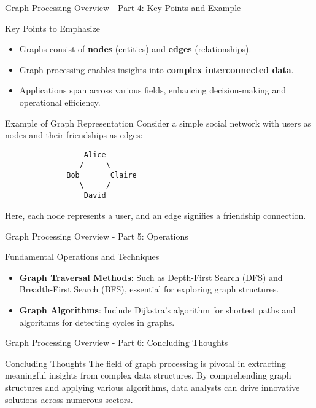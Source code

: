 \documentclass[aspectratio=169]{beamer}
\begin{document}
\begin{frame}[fragile]{Graph Processing Overview - Part 4: Key Points and Example}
    \begin{block}{Key Points to Emphasize}
        \begin{itemize}
            \item Graphs consist of \textbf{nodes} (entities) and \textbf{edges} (relationships).
            \item Graph processing enables insights into \textbf{complex interconnected data}.
            \item Applications span across various fields, enhancing decision-making and operational efficiency.
        \end{itemize}
    \end{block}
    
    \begin{block}{Example of Graph Representation}
        Consider a simple social network with users as nodes and their friendships as edges:
        \begin{center}
            \begin{verbatim}
                  Alice
                 /     \
              Bob       Claire
                 \     /
                  David
            \end{verbatim}
        \end{center}
        Here, each node represents a user, and an edge signifies a friendship connection.
    \end{block}
\end{frame}

\begin{frame}[fragile]{Graph Processing Overview - Part 5: Operations}
    \begin{block}{Fundamental Operations and Techniques}
        \begin{itemize}
            \item \textbf{Graph Traversal Methods}: Such as Depth-First Search (DFS) and Breadth-First Search (BFS), essential for exploring graph structures.
            \item \textbf{Graph Algorithms}: Include Dijkstra’s algorithm for shortest paths and algorithms for detecting cycles in graphs.
        \end{itemize}
    \end{block}
\end{frame}

\begin{frame}[fragile]{Graph Processing Overview - Part 6: Concluding Thoughts}
    \begin{block}{Concluding Thoughts}
        The field of graph processing is pivotal in extracting meaningful insights from complex data structures. By comprehending graph structures and applying various algorithms, data analysts can drive innovative solutions across numerous sectors.
    \end{block}
\end{frame}
\end{document}
